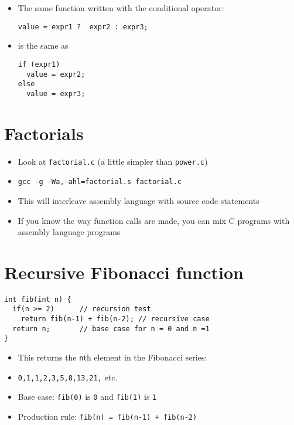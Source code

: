 \documentclass{article}
\begin{document}
\begin{itemize}
\item The same function written with the conditional operator:
\begin{verbatim}
value = expr1 ?  expr2 : expr3;
\end{verbatim}

\item is the same as
\begin{verbatim}
if (expr1)
  value = expr2;
else
  value = expr3;
\end{verbatim}
\end{itemize}



\section{Factorials}
\begin{itemize}
\item Look at \verb!factorial.c! (a little simpler than \verb!power.c!)

\item \verb!gcc -g -Wa,-ahl=factorial.s factorial.c!
\item This will interleave assembly language with source code statements

\item If you know the way function calls are made, you can mix C programs with assembly language programs
\end{itemize}



\section{Recursive Fibonacci function}
\begin{verbatim}
int fib(int n) {
  if(n >= 2)      // recursion test  
    return fib(n-1) + fib(n-2); // recursive case
  return n;       // base case for n = 0 and n =1
}
\end{verbatim}

\begin{itemize}
\item This returns the \verb!n!th element in the Fibonacci series:

\item \verb!0,1,1,2,3,5,8,13,21,! etc.

\item Base case: \verb!fib(0)! is \verb!0! and \verb!fib(1)! is \verb!1! 
\item Production rule: \verb!fib(n) = fib(n-1) + fib(n-2)!
\end{itemize}
\end{document}
